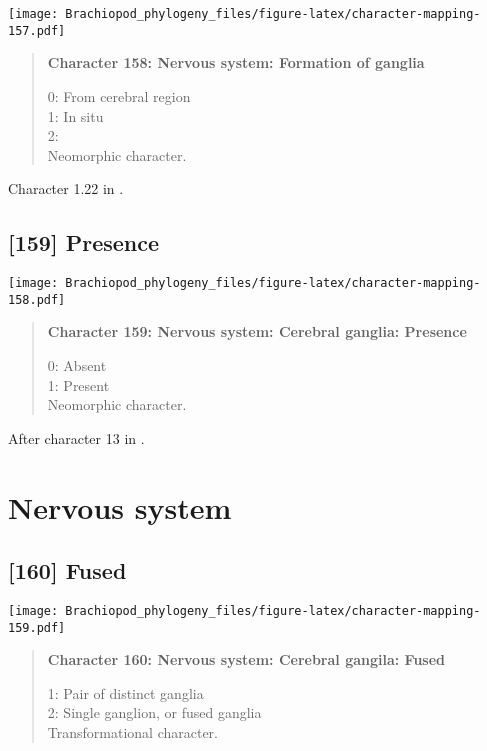\documentclass[openany]{book}
\theoremstyle{definition}
\theoremstyle{definition}
\theoremstyle{definition}
\theoremstyle{remark}
\begin{document}
\texttt{[image: Brachiopod\_phylogeny\_files/figure-latex/character-mapping-157.pdf]}

\begin{quote}
\textbf{Character 158: Nervous system: Formation of ganglia}

0: From cerebral region\\
1: In situ\\
2:\\
Neomorphic character.
\end{quote}

Character 1.22 in \citet{SPS1996}.

\subsection*{{[}159{]} Presence}\label{presence-2}

\texttt{[image: Brachiopod\_phylogeny\_files/figure-latex/character-mapping-158.pdf]}

\begin{quote}
\textbf{Character 159: Nervous system: Cerebral ganglia: Presence}

0: Absent\\
1: Present\\
Neomorphic character.
\end{quote}

After character 13 in \citet{Haszprunar1996}.

\section{Nervous system}\label{nervous-system-1}

\subsection*{{[}160{]} Fused}\label{fused}

\texttt{[image: Brachiopod\_phylogeny\_files/figure-latex/character-mapping-159.pdf]}

\begin{quote}
\textbf{Character 160: Nervous system: Cerebral gangila: Fused}

1: Pair of distinct ganglia\\
2: Single ganglion, or fused ganglia\\
Transformational character.
\end{quote}
\end{document}
